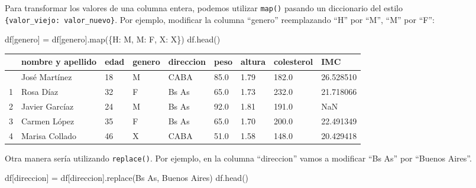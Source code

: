 \documentclass[
  letterpaper,
  DIV=11,
  numbers=noendperiod]{scrreprt}
\newenvironment{Shaded}{\begin{snugshade}}{\end{snugshade}}
\newcommand{\BuiltInTok}[1]{\textcolor[rgb]{0.00,0.23,0.31}{#1}}
\newcommand{\NormalTok}[1]{\textcolor[rgb]{0.00,0.23,0.31}{#1}}
\newcommand{\OperatorTok}[1]{\textcolor[rgb]{0.37,0.37,0.37}{#1}}
\newcommand{\StringTok}[1]{\textcolor[rgb]{0.13,0.47,0.30}{#1}}
\begin{document}
Para transformar los valores de una columna entera, podemos utilizar
\texttt{map()} pasando un diccionario del estilo
\texttt{\{valor\_viejo:\ valor\_nuevo\}}. Por ejemplo, modificar la
columna ``genero'' reemplazando ``H'' por ``M'', ``M'' por ``F'':

\begin{Shaded}
\begin{Highlighting}[]
\NormalTok{df[}\StringTok{\textquotesingle{}genero\textquotesingle{}}\NormalTok{] }\OperatorTok{=}\NormalTok{ df[}\StringTok{\textquotesingle{}genero\textquotesingle{}}\NormalTok{].}\BuiltInTok{map}\NormalTok{(\{}\StringTok{\textquotesingle{}H\textquotesingle{}}\NormalTok{: }\StringTok{\textquotesingle{}M\textquotesingle{}}\NormalTok{, }\StringTok{\textquotesingle{}M\textquotesingle{}}\NormalTok{: }\StringTok{\textquotesingle{}F\textquotesingle{}}\NormalTok{, }\StringTok{\textquotesingle{}X\textquotesingle{}}\NormalTok{: }\StringTok{\textquotesingle{}X\textquotesingle{}}\NormalTok{\})}
\NormalTok{df.head()}
\end{Highlighting}
\end{Shaded}

\begin{longtable}[]{@{}lllllllll@{}}
\toprule\noalign{}
& nombre y apellido & edad & genero & direccion & peso & altura &
colesterol & IMC \\
\midrule\noalign{}
\endhead
\bottomrule\noalign{}
\endlastfoot
0 & José Martínez & 18 & M & CABA & 85.0 & 1.79 & 182.0 & 26.528510 \\
1 & Rosa Díaz & 32 & F & Bs As & 65.0 & 1.73 & 232.0 & 21.718066 \\
2 & Javier Garcíaz & 24 & M & Bs As & 92.0 & 1.81 & 191.0 & NaN \\
3 & Carmen López & 35 & F & Bs As & 65.0 & 1.70 & 200.0 & 22.491349 \\
4 & Marisa Collado & 46 & X & CABA & 51.0 & 1.58 & 148.0 & 20.429418 \\
\end{longtable}

Otra manera sería utilizando \texttt{replace()}. Por ejemplo, en la
columna ``direccion'' vamos a modificar ``Bs As'' por ``Buenos Aires''.

\begin{Shaded}
\begin{Highlighting}[]
\NormalTok{df[}\StringTok{\textquotesingle{}direccion\textquotesingle{}}\NormalTok{] }\OperatorTok{=}\NormalTok{ df[}\StringTok{\textquotesingle{}direccion\textquotesingle{}}\NormalTok{].replace(}\StringTok{\textquotesingle{}Bs As\textquotesingle{}}\NormalTok{, }\StringTok{\textquotesingle{}Buenos Aires\textquotesingle{}}\NormalTok{)}
\NormalTok{df.head()}
\end{Highlighting}
\end{Shaded}
\end{document}

